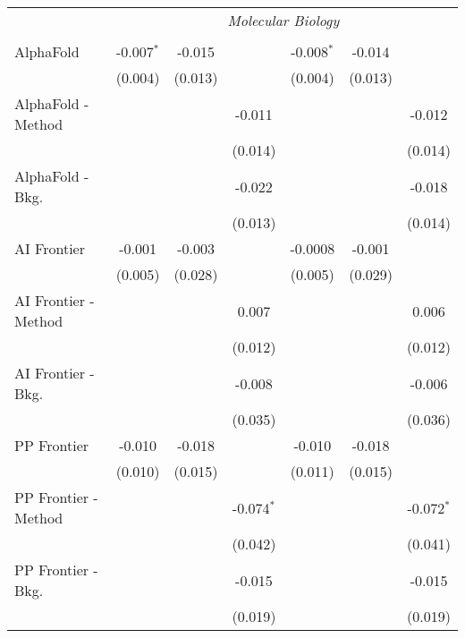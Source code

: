\begin{tabular}{lcccccc}
 & \multicolumn{6}{c}{\textit{Molecular Biology}} \\ \\
   AlphaFold            & -0.007$^{*}$ & -0.015  &              & -0.008$^{*}$ & -0.014  &   \\   
                        & (0.004)      & (0.013) &              & (0.004)      & (0.013) &   \\   
   AlphaFold - Method   &              &         & -0.011       &              &         & -0.012\\   
                        &              &         & (0.014)      &              &         & (0.014)\\   
   AlphaFold - Bkg.     &              &         & -0.022       &              &         & -0.018\\   
                        &              &         & (0.013)      &              &         & (0.014)\\   
   AI Frontier          & -0.001       & -0.003  &              & -0.0008      & -0.001  &   \\   
                        & (0.005)      & (0.028) &              & (0.005)      & (0.029) &   \\   
   AI Frontier - Method &              &         & 0.007        &              &         & 0.006\\   
                        &              &         & (0.012)      &              &         & (0.012)\\   
   AI Frontier - Bkg.   &              &         & -0.008       &              &         & -0.006\\   
                        &              &         & (0.035)      &              &         & (0.036)\\   
   PP Frontier          & -0.010       & -0.018  &              & -0.010       & -0.018  &   \\   
                        & (0.010)      & (0.015) &              & (0.011)      & (0.015) &   \\   
   PP Frontier - Method &              &         & -0.074$^{*}$ &              &         & -0.072$^{*}$\\   
                        &              &         & (0.042)      &              &         & (0.041)\\   
   PP Frontier - Bkg.   &              &         & -0.015       &              &         & -0.015\\   
                        &              &         & (0.019)      &              &         & (0.019)\\   

\end{tabular}
